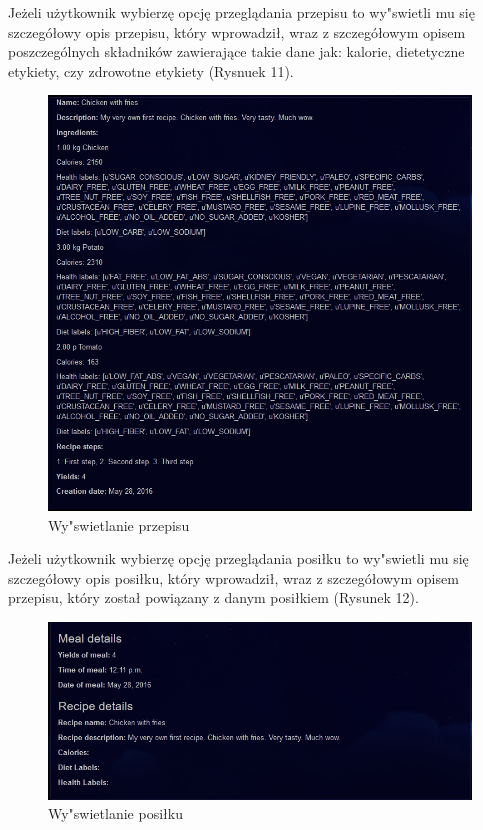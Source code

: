 \documentclass{article}
\begin{document}
Jeżeli użytkownik wybierzę opcję przeglądania przepisu to wy"swietli mu się szczegółowy opis przepisu, który wprowadził, wraz z szczegółowym opisem poszczególnych składników zawierające takie dane jak: kalorie, dietetyczne etykiety, czy zdrowotne etykiety (Rysnuek 11).
\begin{figure}[!ht]
  \centering
   \includegraphics[width=1\textwidth]{reshp10}\par\vspace{1cm}
  \caption{Wy"swietlanie przepisu}
\end{figure}
\newpage
Jeżeli użytkownik wybierzę opcję przeglądania posiłku to wy"swietli mu się szczegółowy opis posiłku, który wprowadził, wraz z szczegółowym opisem przepisu, który został powiązany z danym posiłkiem (Rysunek 12).
\begin{figure}[!ht]
  \centering
   \includegraphics[width=1\textwidth]{reshp11}\par\vspace{1cm}
  \caption{Wy"swietlanie posiłku}
\end{figure}
\end{document}
